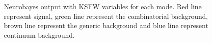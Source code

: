 \begin{figure}[ht]
{		\label{k0nbksfw}
	}
\caption{Neurobayes output with KSFW variables for each mode. Red line represent signal, green line represent the combinatorial background,  brown line represent the generic background and blue line represent continuum background.}
\label{fig:nbksfw}	
\end{figure}


